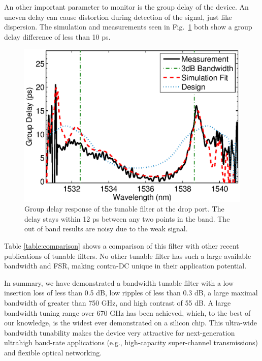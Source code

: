 \documentclass[9pt,twocolumn,twoside]{osajnl}
\begin{document}
An other important parameter to monitor is the group delay of the device. An uneven delay can cause distortion during detection of the signal, just like dispersion. The simulation and measurements seen in Fig.~\ref{fig:phase} both show a group delay difference of less than 10 ps.
\begin{figure}[tbp]
\centering
\includegraphics[width=.99\columnwidth]{data/Phase2}
\caption{ Group delay response of the tunable filter at the drop port. The delay stays within 12 ps between any two points in the band. The out of band results are noisy due to the weak signal.}
\label{fig:phase}
\end{figure}

Table \ref{table:comparison} shows a comparison of this filter with other recent publications of tunable filters. No other tunable filter has such a large available bandwidth and FSR, making contra-DC unique in their application potential.


In summary, we have demonstrated a bandwidth tunable filter with a low insertion loss of less than 0.5 dB, low ripples of less than 0.3 dB, a large maximal bandwidth of greater than 750 GHz, and high contrast of 55 dB. 
A large bandwidth tuning range over 670 GHz has been achieved, which, to the best of our knowledge, is the widest ever demonstrated on a silicon chip. 
This ultra-wide bandwidth tunability makes the device very attractive for next-generation ultrahigh baud-rate applications (e.g., high-capacity super-channel transmissions) and flexible optical networking. 
\end{document}
